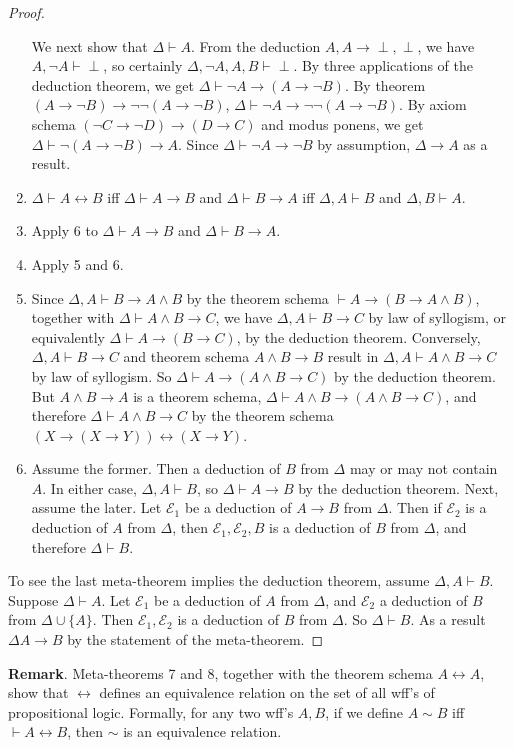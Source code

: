 \documentclass[12pt]{article}
\begin{document}
\begin{proof}
\begin{enumerate}
We next show that $\Delta \vdash A$.  From the deduction $A,A\to \perp, \perp$, we have $A,\neg A \vdash \perp$, so certainly $\Delta, \neg A, A, B \vdash \perp$.  By three applications of the deduction theorem, we get $\Delta \vdash \neg A \to (A\to \neg B)$.  By theorem $(A\to \neg B) \to \neg \neg (A\to \neg B)$, $\Delta \vdash \neg A \to \neg \neg (A\to \neg B)$.  By axiom schema $(\neg C \to \neg D)\to (D\to C)$ and modus ponens, we get $\Delta \vdash \neg (A\to \neg B)\to A$.  Since $\Delta \vdash \neg A\to \neg B$ by assumption, $\Delta \to A$ as a result.
\item
$\Delta \vdash A\leftrightarrow B$ iff $\Delta \vdash A\to B$ and $\Delta \vdash B\to A$ iff $\Delta, A \vdash B$ and $\Delta, B \vdash A$.
\item
Apply 6 to $\Delta \vdash A\to B$ and $\Delta \vdash B\to A$.
\item
Apply 5 and 6.
\item
Since $\Delta,A\vdash B\to A\land B$ by the theorem schema $\vdash A\to (B\to A\land B)$, together with 
$\Delta\vdash A\land B\to C$, we have $\Delta,A\vdash B\to C$ by law of syllogism, or equivalently $\Delta \vdash A\to (B\to C)$, by the deduction theorem.  Conversely, $\Delta, A\vdash B\to C$ and theorem schema $A\land B\to B$ result in $\Delta, A\vdash A\land B\to C$ by law of syllogism.  So $\Delta \vdash A\to (A\land B\to C)$ by the deduction theorem.  But $A\land B\to A$ is a theorem schema, $\Delta \vdash A\land B\to (A\land B\to C)$, and therefore $\Delta \vdash A\land B\to C$ by the theorem schema $(X\to (X\to Y)) \leftrightarrow (X\to Y)$.
\item
Assume the former.  Then a deduction of $B$ from $\Delta$ may or may not contain $A$.  In either case, $\Delta, A \vdash B$, so $\Delta \vdash A\to B$ by the deduction theorem.  Next, assume the later.  Let $\mathcal{E}_1$ be a deduction of $A\to B$ from $\Delta$.  Then if $\mathcal{E}_2$ is a deduction of $A$ from $\Delta$, then $\mathcal{E}_1, \mathcal{E}_2, B$ is a deduction of $B$ from $\Delta$, and therefore $\Delta \vdash B$.
\end{enumerate}
To see the last meta-theorem implies the deduction theorem, assume $\Delta, A \vdash B$.  Suppose $\Delta \vdash A$.  Let $\mathcal{E}_1$ be a deduction of $A$ from $\Delta$, and $\mathcal{E}_2$ a deduction of $B$ from $\Delta\cup \lbrace A \rbrace$.  Then $\mathcal{E}_1,\mathcal{E}_2$ is a deduction of $B$ from $\Delta$.  So $\Delta \vdash B$.  As a result $\Delta A\to B$ by the statement of the meta-theorem.
\end{proof}

\textbf{Remark}.  Meta-theorems 7 and 8, together with the theorem schema $A\leftrightarrow A$, show that $\leftrightarrow$ defines an equivalence relation on the set of all wff's of propositional logic.  Formally, for any two wff's $A,B$, if we define $A\sim B$ iff $\vdash A\leftrightarrow B$, then $\sim$ is an equivalence relation.

\end{document}
